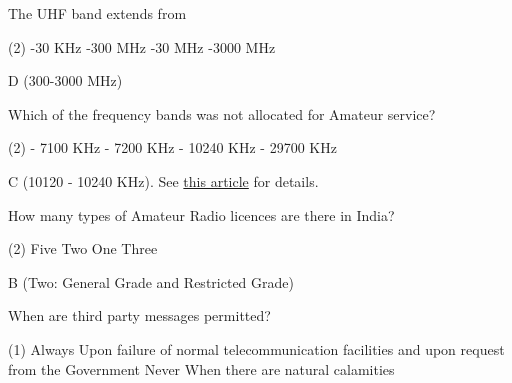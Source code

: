 \documentclass[a4paper]{article}
\begin{document}
\begin{question}The UHF band extends from
	\begin{tasks}(2)
		-30 KHz
		-300 MHz
		-30 MHz
		-3000 MHz
	\end{tasks}
\end{question}

\begin{solution}
	D (300-3000 MHz)
\end{solution}

\vspace{5mm}



\begin{question}Which of the frequency bands was not allocated for Amateur service?
	\begin{tasks}(2)
		 - 7100 KHz
		 - 7200 KHz
		 - 10240 KHz
		 - 29700 KHz
	\end{tasks}
\end{question}

\begin{solution}
	C (10120 - 10240 KHz). See \href{https://en.wikipedia.org/wiki/List_of_amateur_radio_frequency_bands_in_India}{this article} for details.
\end{solution}

\vspace{5mm}




\begin{question}How many types of Amateur Radio licences are there in India?
	\begin{tasks}(2)
		\task Five
		\task Two
		\task One
		\task Three
	\end{tasks}
\end{question}

\begin{solution}
	B (Two: General Grade and Restricted Grade)
\end{solution}

\vspace{5mm}



\begin{question}When are third party messages permitted?
	\begin{tasks}(1)
		\task Always
		\task Upon failure of normal telecommunication facilities and upon request from the Government
		\task Never
		\task When there are natural calamities
	\end{tasks}
\end{question}
\end{document}
